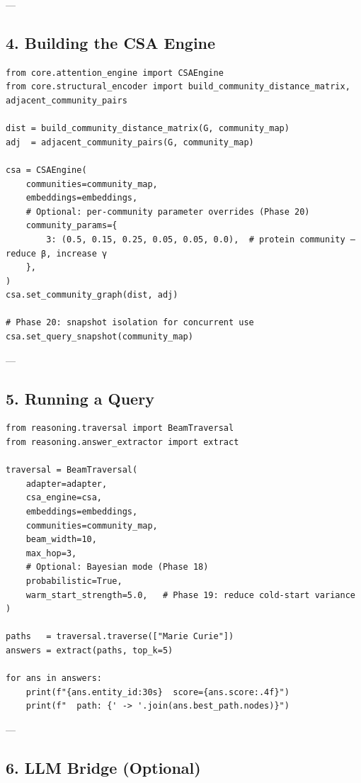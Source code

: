 \documentclass[11pt,article,oneside]{memoir}
\begin{document}
---

\subsection{4. Building the CSA Engine}

\begin{lstlisting}
from core.attention_engine import CSAEngine
from core.structural_encoder import build_community_distance_matrix, adjacent_community_pairs

dist = build_community_distance_matrix(G, community_map)
adj  = adjacent_community_pairs(G, community_map)

csa = CSAEngine(
    communities=community_map,
    embeddings=embeddings,
    # Optional: per-community parameter overrides (Phase 20)
    community_params={
        3: (0.5, 0.15, 0.25, 0.05, 0.05, 0.0),  # protein community — reduce β, increase γ
    },
)
csa.set_community_graph(dist, adj)

# Phase 20: snapshot isolation for concurrent use
csa.set_query_snapshot(community_map)
\end{lstlisting}

---

\subsection{5. Running a Query}

\begin{lstlisting}
from reasoning.traversal import BeamTraversal
from reasoning.answer_extractor import extract

traversal = BeamTraversal(
    adapter=adapter,
    csa_engine=csa,
    embeddings=embeddings,
    communities=community_map,
    beam_width=10,
    max_hop=3,
    # Optional: Bayesian mode (Phase 18)
    probabilistic=True,
    warm_start_strength=5.0,   # Phase 19: reduce cold-start variance
)

paths   = traversal.traverse(["Marie Curie"])
answers = extract(paths, top_k=5)

for ans in answers:
    print(f"{ans.entity_id:30s}  score={ans.score:.4f}")
    print(f"  path: {' -> '.join(ans.best_path.nodes)}")
\end{lstlisting}

---

\subsection{6. LLM Bridge (Optional)}
\end{document}
